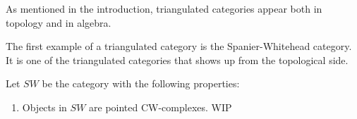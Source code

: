 As mentioned in the introduction, triangulated categories appear both in topology and in algebra.

The first example of a triangulated category is the Spanier-Whitehead category. It is one of the triangulated categories that shows up from the topological side.

\begin{definition}
    Let \( SW \) be the category with the following properties:
    \begin{enumerate}
        \item {
            Objects in \( SW \) are pointed CW-complexes. WIP
        }
    \end{enumerate}
\end{definition}